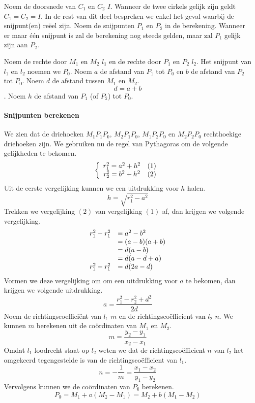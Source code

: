 Noem de doorsnede van $C_1$ en $C_2$ $I$. Wanneer de twee cirkels gelijk zijn geldt $C_1 = C_2 = I$.
In de rest van dit deel bespreken we enkel het geval waarbij de snijpunt(en) re\"eel zijn.
Noem de snijpunten $P_1$ en $P_2$ in de berekening.
Wanneer er maar \'e\'en snijpunt is zal de berekening nog steeds gelden, maar zal $P_1$ gelijk zijn aan $P_2$.

Noem de rechte door $M_1$ en $M_2$ $l_1$ en de rechte door $P_1$ en $P_2$ $l_2$.
Het snijpunt van $l_1$ en $l_2$ noemen we $P_0$.
Noem $a$ de afstand van $P_1$ tot $P_0$ en $b$ de afstand van $P_2$ tot $P_0$.
Noem $d$ de afstand tussen $M_1$ en $M_2$.
\[
d = a + b
\]
.
Noem $h$ de afstand van $P_1$ (of $P_2$) tot $P_0$.

\paragraph{Snijpunten berekenen}
We zien dat de driehoeken $M_1P_1P_0$, $M_2P_1P_0$, $M_1P_2P_0$ en $M_2P_2P_0$ rechthoekige driehoeken zijn. We gebruiken nu de regel van Pythagoras om de volgende gelijkheden te bekomen.
\[
\left\{
\begin{array}{c l r}
r_1^2 = a^2 + h^2 & (1)\\
r_2^2 = b^2 + h^2 & (2)
\end{array}
\right.
\]
Uit de eerste vergelijking kunnen we een uitdrukking voor $h$ halen.
\[
h = \sqrt{r_{1}^{2}-a^{2}}
\]
Trekken we vergelijking $(2)$ van vergelijking $(1)$ af, dan krijgen we volgende vergelijking.
\[
\begin{array}{r l}
r_1^2 -r_1^2 & = a^2 - b^2\\
& = (a-b)(a+b)\\
& = d(a-b)\\
& = d(a-d+a)\\
r_1^2 -r_1^2 & = d(2a-d)
\end{array}
\]
Vormen we deze vergelijking om om een uitdrukking voor $a$ te bekomen, dan krijgen we volgende uitdrukking.
\[
a = \frac{r_1^2-r_2^2 + d^2}{2d}
\]
Noem de richtingscoeffici\"ent van $l_1$ $m$ en de richtingsco\"efficient van $l_2$ $n$.
We kunnen $m$ berekenen uit de co\"ordinaten van $M_1$ en $M_2$.
\[
m = \frac{y_2-y_1}{x_2-x_1}
\]
Omdat $l_1$ loodrecht staat op $l_2$ weten we dat de richtingsco\"efficient $n$ van $l_2$ het omgekeerd tegengestelde is van de richtingsco\"efficient van $l_1$.
\[
n = -\frac{1}{m} = \frac{x_1-x_2}{y_1-y_2}
\]
Vervolgens kunnen we de co\"ordinaten van $P_0$ berekenen.
\[
P_0 = M_1 + a(M_2-M_1) = M_2 + b(M_1-M_2)
\]
